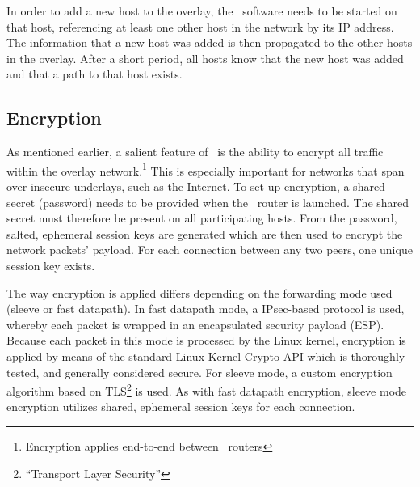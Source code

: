 In order to add a new host to the overlay, the \weave\ software needs to be started on that host, referencing at least one other host in the network by its IP address. The information that a new host was added is then propagated to the other hosts in the overlay. After a short period, all hosts know that the new host was added and that a path to that host exists.

\subsection{Encryption} 
As mentioned earlier, a salient feature of \wnet\ is the ability to encrypt all traffic within the overlay network.\footnote{Encryption applies end-to-end between \weave\ routers} This is especially important for networks that span over insecure underlays, such as the Internet. To set up encryption, a shared secret (password) needs to be provided when the \weave\ router is launched. The shared secret must therefore be present on all participating hosts. From the password, salted, ephemeral session keys are generated which are then used to encrypt the network packets' payload. For each connection between any two peers, one unique session key exists.

The way encryption is applied differs depending on the forwarding mode used (sleeve or fast datapath). In fast datapath mode, a IPsec-based protocol is used, whereby each packet is wrapped in an encapsulated security payload (ESP). Because each packet in this mode is processed by the Linux kernel, encryption is applied by means of the standard Linux Kernel Crypto API which is thoroughly tested, and generally considered secure. For sleeve mode, a custom encryption algorithm based on TLS\footnote{``Transport Layer Security''} is used. As with fast datapath encryption, sleeve mode encryption utilizes shared, ephemeral session keys for each connection.

